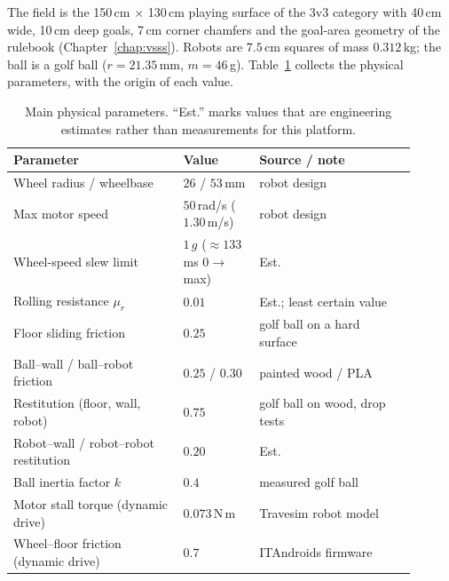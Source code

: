 The field is the 150\,cm $\times$ 130\,cm playing surface of the 3v3 category with
40\,cm wide, 10\,cm deep goals, 7\,cm corner chamfers and the goal-area
geometry of the rulebook (Chapter~\ref{chap:vsss}).  Robots are $7.5$\,cm squares of mass
$0.312$\,kg; the ball is a golf ball ($r = 21.35$\,mm, $m = 46$\,g).
Table~\ref{tab:sim_params} collects the physical parameters, with the origin of
each value.

\begin{table}[ht]
    \centering
    \caption{Main physical parameters.  ``Est.'' marks values that are engineering
    estimates rather than measurements for this platform.}
    \label{tab:sim_params}
    \small
    \begin{tabular}{p{0.38\linewidth}p{0.17\linewidth}p{0.35\linewidth}}
        \toprule
        \textbf{Parameter} & \textbf{Value} & \textbf{Source / note} \\
        \midrule
        Wheel radius / wheelbase        & $26$ / $53$\,mm      & robot design \\
        Max motor speed                 & $50$\,rad/s ($1.30$\,m/s) & robot design \\
        Wheel-speed slew limit          & $1\,g$ ($\approx 133$\,ms $0\to$max) & Est. \\
        Rolling resistance $\mu_r$      & $0.01$   & Est.; least certain value \\
        Floor sliding friction          & $0.25$   & golf ball on a hard surface~\cite{cross2002gripslip} \\
        Ball--wall / ball--robot friction & $0.25$ / $0.30$ & painted wood / PLA \\
        Restitution (floor, wall, robot) & $0.75$  & golf ball on wood, drop tests~\cite{haron2012cor} \\
        Robot--wall / robot--robot restitution & $0.20$ & Est. \\
        Ball inertia factor $k$         & $0.4$ & measured golf ball~\cite{cross2002gripslip} \\
        Motor stall torque (dynamic drive) & $0.073$\,N\,m & Travesim robot model \\
        Wheel--floor friction (dynamic drive) & $0.7$ & ITAndroids firmware \\
        \bottomrule
    \end{tabular}
\end{table}

